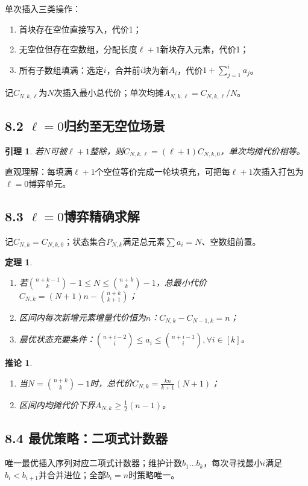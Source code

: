 \documentclass[11pt,a4paper]{article}
\newtheorem{thm}{定理}[section]
\newtheorem{lem}{引理}[section]
\newtheorem{cor}{推论}[section]
\begin{document}
单次插入三类操作：
\begin{enumerate}
    \item 首块存在空位直接写入，代价1；
    \item 无空位但存在空数组，分配长度$\ell+1$新块存入元素，代价1；
    \item 所有子数组填满：选定$i$，合并前$i$块为新$A_i$，代价$1+\sum_{j=1}^i a_j$。
\end{enumerate}
记$C_{N,k,\ell}$为$N$次插入最小总代价；单次均摊$A_{N,k,\ell}=C_{N,k,\ell}/N$。

\subsection{8.2 \texorpdfstring{$\ell=0$}{l=0}归约至无空位场景}
\begin{lem}
若$N$可被$\ell+1$整除，则$C_{N,k,\ell}=(\ell+1)C_{N,k,0}$，单次均摊代价相等。
\end{lem}
直观理解：每填满$\ell+1$个空位等价完成一轮块填充，可把每$\ell+1$次插入打包为$\ell=0$博弈单元。

\subsection{8.3 \texorpdfstring{$\ell=0$}{l=0}博弈精确求解}
记$C_{N,k}=C_{N,k,0}$；状态集合$P_{N,k}$满足总元素$\sum a_i=N$、空数组前置。
\begin{thm}
\begin{enumerate}
    \item 若$\binom{n+k-1}{k}-1\le N\le\binom{n+k}{k}-1$，总最小代价$C_{N,k}=(N+1)n-\binom{n+k}{k+1}$；
    \item 区间内每次新增元素增量代价恒为$n$：$C_{N,k}-C_{N-1,k}=n$；
    \item 最优状态充要条件：$\binom{n+i-2}{i}\le a_i\le\binom{n+i-1}{i},\forall i\in[k]$。
\end{enumerate}
\end{thm}
\begin{cor}
\begin{enumerate}
    \item 当$N=\binom{n+k}{k}-1$时，总代价$C_{N,k}=\frac{kn}{k+1}(N+1)$；
    \item 区间内均摊代价下界$A_{N,k}\ge\frac{1}{2}(n-1)$。
\end{enumerate}
\end{cor}

\subsection{8.4 最优策略：二项式计数器}
唯一最优插入序列对应二项式计数器；维护计数$b_1\dots b_k$，每次寻找最小$i$满足$b_i<b_{i+1}$并合并进位；全部$b_i=n$时策略唯一。
\end{document}
